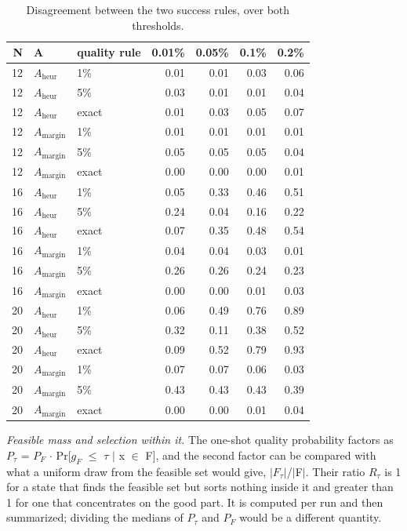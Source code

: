 \documentclass[journal]{IEEEtran}
\begin{document}
\begin{table}[!t]
\centering
\scriptsize
\caption{Disagreement between the two success rules, over both thresholds.}
\label{tab:S16}
\begin{tabular}{rllrrrr}
\toprule
N & A & quality rule & 0.01\% & 0.05\% & 0.1\% & 0.2\% \\
\midrule
12 & $A_{\mathrm{heur}}$ & 1\% & 0.01 & 0.01 & 0.03 & 0.06 \\
12 & $A_{\mathrm{heur}}$ & 5\% & 0.03 & 0.01 & 0.01 & 0.04 \\
12 & $A_{\mathrm{heur}}$ & exact & 0.01 & 0.03 & 0.05 & 0.07 \\
12 & $A_{\mathrm{margin}}$ & 1\% & 0.01 & 0.01 & 0.01 & 0.01 \\
12 & $A_{\mathrm{margin}}$ & 5\% & 0.05 & 0.05 & 0.05 & 0.04 \\
12 & $A_{\mathrm{margin}}$ & exact & 0.00 & 0.00 & 0.00 & 0.01 \\
16 & $A_{\mathrm{heur}}$ & 1\% & 0.05 & 0.33 & 0.46 & 0.51 \\
16 & $A_{\mathrm{heur}}$ & 5\% & 0.24 & 0.04 & 0.16 & 0.22 \\
16 & $A_{\mathrm{heur}}$ & exact & 0.07 & 0.35 & 0.48 & 0.54 \\
16 & $A_{\mathrm{margin}}$ & 1\% & 0.04 & 0.04 & 0.03 & 0.01 \\
16 & $A_{\mathrm{margin}}$ & 5\% & 0.26 & 0.26 & 0.24 & 0.23 \\
16 & $A_{\mathrm{margin}}$ & exact & 0.00 & 0.00 & 0.01 & 0.03 \\
20 & $A_{\mathrm{heur}}$ & 1\% & 0.06 & 0.49 & 0.76 & 0.89 \\
20 & $A_{\mathrm{heur}}$ & 5\% & 0.32 & 0.11 & 0.38 & 0.52 \\
20 & $A_{\mathrm{heur}}$ & exact & 0.09 & 0.52 & 0.79 & 0.93 \\
20 & $A_{\mathrm{margin}}$ & 1\% & 0.07 & 0.07 & 0.06 & 0.03 \\
20 & $A_{\mathrm{margin}}$ & 5\% & 0.43 & 0.43 & 0.43 & 0.39 \\
20 & $A_{\mathrm{margin}}$ & exact & 0.00 & 0.00 & 0.01 & 0.04 \\
\bottomrule
\end{tabular}
\end{table}


\textit{Feasible mass and selection within it.} The one-shot quality probability factors as $P_{\tau}$ = $P_{F}$ $\cdot$ Pr[$g_{F}$ $\leq$ $\tau$ $|$ x $\in$ F], and the second factor can be compared with what a uniform draw from the feasible set would give, $|$$F_{\tau}$$|$/$|$F$|$. Their ratio $R_{\tau}$ is 1 for a state that finds the feasible set but sorts nothing inside it and greater than 1 for one that concentrates on the good part. It is computed per run and then summarized; dividing the medians of $P_{\tau}$ and $P_{F}$ would be a different quantity.
\end{document}
